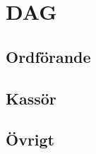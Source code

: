 \section{DAG}
\subsection{Ordförande}
\begin{autoframe}

\end{autoframe}

\subsection{Kassör}
\begin{autoframe}
\end{autoframe}

\subsection{Övrigt}
\begin{autoframe}
\end{autoframe}